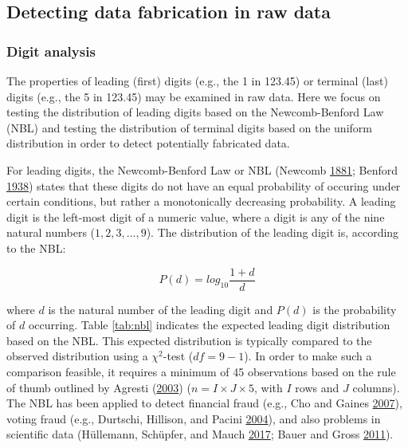 \documentclass[a5paper]{book}
\begin{document}
\subsection{Detecting data fabrication in raw
data}\label{detecting-data-fabrication-in-raw-data}

\subsubsection{Digit analysis}\label{digit-analysis}

The properties of leading (first) digits (e.g., the 1 in 123.45) or
terminal (last) digits (e.g., the 5 in 123.45) may be examined in raw
data. Here we focus on testing the distribution of leading digits based
on the Newcomb-Benford Law (NBL) and testing the distribution of
terminal digits based on the uniform distribution in order to detect
potentially fabricated data.

For leading digits, the Newcomb-Benford Law or NBL (Newcomb
\protect\hyperlink{ref-doi:10.2307ux2f2369148}{1881}; Benford
\protect\hyperlink{ref-doi:10.2307ux2f984802}{1938}) states that these
digits do not have an equal probability of occuring under certain
conditions, but rather a monotonically decreasing probability. A leading
digit is the left-most digit of a numeric value, where a digit is any of
the nine natural numbers (\(1,2,3,...,9\)). The distribution of the
leading digit is, according to the NBL:

\begin{equation}
P(d)=log_{10}\frac{1+d}{d}
\label{eq:nbl}
\end{equation}

where \(d\) is the natural number of the leading digit and \(P(d)\) is
the probability of \(d\) occurring. Table \ref{tab:nbl} indicates the
expected leading digit distribution based on the NBL. This expected
distribution is typically compared to the observed distribution using a
\(\chi^2\)-test (\(df=9-1\)). In order to make such a comparison
feasible, it requires a minimum of 45 observations based on the rule of
thumb outlined by Agresti
(\protect\hyperlink{ref-isbn:0471360937}{2003})
(\(n=I\times J\times 5\), with \(I\) rows and \(J\) columns). The NBL
has been applied to detect financial fraud (e.g., Cho and Gaines
\protect\hyperlink{ref-doi:10.2307ux2f27643897}{2007}), voting fraud
(e.g., Durtschi, Hillison, and Pacini
\protect\hyperlink{ref-durtschi2004effective}{2004}), and also problems
in scientific data (Hüllemann, Schüpfer, and Mauch
\protect\hyperlink{ref-doi:10.1007ux2fs00101-017-0333-1}{2017}; Bauer
and Gross
\protect\hyperlink{ref-doi:10.1515ux2f9783110508420-010}{2011}).
\end{document}
